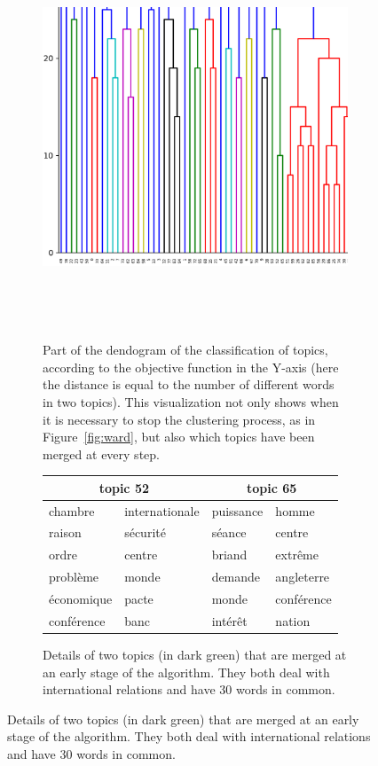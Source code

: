 \documentclass[a4paper,11pt]{article}
\begin{document}
\begin{figure}
\begin{center}
\begin{subfigure}{\textwidth}
	\includegraphics[width=12cm, height=12cm, keepaspectratio]{./img/dendogram}
	\caption{Part of the dendogram of the classification of topics, according to the objective function in the Y-axis (here the distance is equal to the number of different words in two topics). This visualization not only shows when it is necessary to stop the clustering process, as in Figure~\ref{fig:ward}, but also which topics have been merged at every step.}
	\label{fig:dendogram}
\end{subfigure}
\begin{subfigure}{\textwidth}
\begin{center}
\begin{tabular}{|ll|ll|}
	\multicolumn{2}{c}{topic 52} & \multicolumn{2}{c}{topic 65} \\
	\hline
	chambre & internationale & puissance & homme\\
	raison & sécurité & séance & centre\\
	ordre & centre & briand & extrême\\
	problème & monde & demande & angleterre\\
	économique & pacte & monde & conférence\\
	conférence & banc & intérêt & nation\\
	\hline
\end{tabular}
\end{center}
\caption{Details of two topics (in dark green) that are merged at an early stage of the algorithm. They both deal with international relations and have 30 words in common.}
\end{subfigure}
\end{center}
\end{figure}
\end{document}

